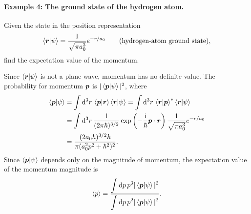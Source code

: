 \paragraph{Example 4: The ground state of the hydrogen atom.}
Given the state in the position representation
\begin{equation}
\left\langle\bm{r}\middle|\psi\right\rangle
=\frac1{\sqrt{\pi a_0^3}}e^{-r/a_0}\qquad\text{(hydrogen-atom ground state)},
\end{equation}
find the expectation value of the momentum.

Since $\left\langle\bm{r}\middle|\psi\right\rangle$ is not a plane wave, momentum has no definite value. The probability for momentum $\bm{p}$ is $|\left\langle\bm{p}\middle|\psi\right\rangle|^2$, where
\begin{equation}\begin{aligned}
\left\langle\bm{p}\middle|\psi\right\rangle
&=\int\mathrm{d}^3r\,\left\langle\bm{p}\middle|\bm{r}\right\rangle\left\langle\bm{r}\middle|\psi\right\rangle
=\int\mathrm{d}^3r\,\left\langle\bm{r}\middle|\bm{p}\right\rangle^*\left\langle\bm{r}\middle|\psi\right\rangle\\
&=\int\mathrm{d}^3r\,\frac1{(2\pi\hbar)^{3/2}}
\exp\left(-\frac{\mathrm{i}}\hbar\bm{p}\cdot\bm{r}\right)
\frac1{\sqrt{\pi a_0^3}}e^{-r/a_0}\\
&=\frac{(2a_0\hbar)^{3/2}\hbar}{\pi(a_0^2p^2+\hbar^2)^2}.
\end{aligned}\end{equation}
Since $\left\langle\bm{p}\middle|\psi\right\rangle$ depends only on the magnitude of momentum, the expectation value of the momentum magnitude is
\begin{equation}
\langle p\rangle=\frac{\displaystyle\int\mathrm{d} p\,p^3|\left\langle\bm{p}\middle|\psi\right\rangle|^2}
{\displaystyle\int\mathrm{d} p\,p^2|\left\langle\bm{p}\middle|\psi\right\rangle|^2}.
\end{equation}
